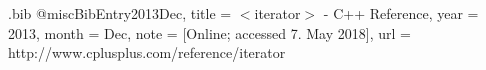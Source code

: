 

\usepackage{natbib}
\usepackage{filecontents}
\usepackage{cleveref}

\begin{filecontents}{\jobname.bib}
    @misc{BibEntry2013Dec,
    	title = {{{$<$}iterator{$>$} - C++ Reference}},
    	year = {2013},
    	month = {Dec},
    	note = {[Online; accessed 7. May 2018]},
    	url = {http://www.cplusplus.com/reference/iterator}
    }
\end{filecontents}

\newcommand{\hmwkTitle}{Assignment 03} %
\newcommand{\hmwkClass}{CPPPC} %
\newcommand{\hmwkAuthorName}{Marius Herget} %


\maketitle\tableofcontents\newpage
